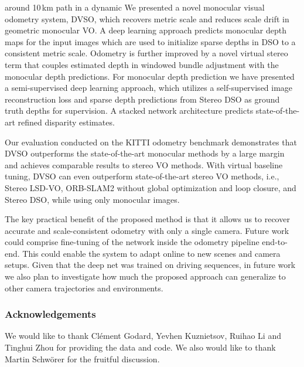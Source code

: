 \documentclass[runningheads]{llncs}
\begin{document}
around 10\,km path in a dynamic %
We presented a novel monocular visual odometry system, DVSO, which recovers metric scale and 
reduces scale drift in geometric monocular VO. A deep learning approach predicts monocular
depth maps for the input images which are used to initialize sparse depths in DSO to a consistent 
metric scale. Odometry is further improved by a novel 
virtual stereo term that couples estimated depth in windowed bundle adjustment with the monocular depth predictions. 
For monocular depth prediction we have presented a semi-supervised deep learning 
approach, which utilizes a self-supervised image reconstruction loss and sparse depth predictions from Stereo DSO as 
ground truth depths for supervision. A stacked network
architecture predicts state-of-the-art refined disparity estimates. 

Our evaluation conducted on the KITTI odometry benchmark demonstrates that DVSO outperforms the 
state-of-the-art monocular methods by a large margin and 
achieves comparable results to stereo VO methods. With virtual baseline tuning, 
DVSO can even outperform state-of-the-art stereo VO 
methods, i.e., Stereo LSD-VO, ORB-SLAM2 without global optimization and loop closure, and Stereo DSO, while using 
only monocular images.

The key practical benefit of the proposed method is that it allows us to recover accurate and scale-consistent odometry with only a single camera.
Future work could comprise fine-tuning of the network inside the odometry pipeline end-to-end.
This could enable the system to adapt online to new scenes and camera setups.
Given that the deep net was trained on driving sequences, in future work we 
also plan to investigate how much the proposed approach can generalize to other 
camera trajectories and environments.

\subsubsection{Acknowledgements} We would like to thank Cl\'{e}ment Godard, 
Yevhen Kuznietsov, Ruihao Li and Tinghui Zhou for providing the data and code. 
We also would like to thank Martin Schw\"{o}rer for the fruitful 
discussion.
\end{document}
